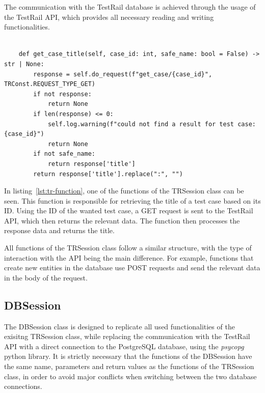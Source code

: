 The communication with the TestRail database is achieved through the usage of the TestRail API, which provides all necessary reading and writing functionalities.

\begin{lstlisting}[caption={Code snippet of the get\_case\_title function within the TRSession class.}, label={lst:tr-function}]

    def get_case_title(self, case_id: int, safe_name: bool = False) -> str | None:
        response = self.do_request(f"get_case/{case_id}", TRConst.REQUEST_TYPE_GET)
        if not response:
            return None
        if len(response) <= 0:
            self.log.warning(f"could not find a result for test case: {case_id}")
            return None
        if not safe_name:
            return response['title']
        return response['title'].replace(":", "")

\end{lstlisting}

In listing~\ref{lst:tr-function}, one of the functions of the TRSession class can be seen. This function is responsible for retrieving the title of a test case based on its ID. Using the ID of the wanted test case, a GET request is sent to the TestRail API, which then returns the relevant data. The function then processes the response data and returns the title. 

All functions of the TRSession class follow a similar structure, with the type of interaction with the API being the main difference. For example, functions that create new entities in the database use POST requests and send the relevant data in the body of the request.

\subsection{DBSession}

The DBSession class is designed to replicate all used functionalities of the exisitng TRSession class, while replacing the communication with the TestRail API with a direct connection to the PostgreSQL database, using the \textit{psycopg} python library. It is strictly necessary that the functions of the DBSession have the same name, parameters and return values as the functions of the TRSession class, in order to avoid major conflicts when switching between the two database connections.

